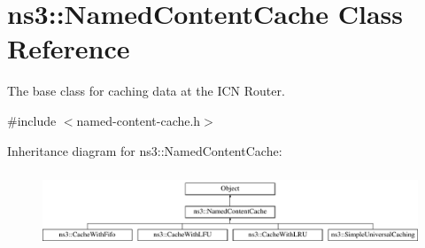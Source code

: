 \hypertarget{classns3_1_1NamedContentCache}{\section{ns3\-:\-:Named\-Content\-Cache Class Reference}
\label{classns3_1_1NamedContentCache}
}


The base class for caching data at the I\-C\-N Router.  




{\ttfamily \#include $<$named-\/content-\/cache.\-h$>$}

Inheritance diagram for ns3\-:\-:Named\-Content\-Cache\-:\begin{figure}[H]
\begin{center}
\leavevmode
\includegraphics[height=2.295082cm]{classns3_1_1NamedContentCache}
\end{center}
\end{figure}
